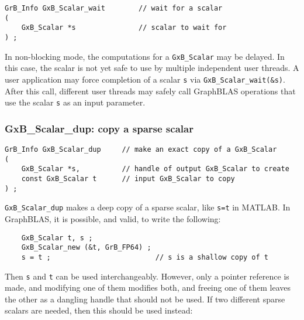\documentclass[12pt]{article}
\begin{document}
\begin{mdframed}[userdefinedwidth=6in]
{\footnotesize
\begin{verbatim}
GrB_Info GxB_Scalar_wait        // wait for a scalar
(
    GxB_Scalar *s               // scalar to wait for
) ;
\end{verbatim}
}\end{mdframed}

In non-blocking mode, the computations for a \verb'GxB_Scalar' may be delayed.
In this case, the scalar is not yet safe to use by multiple independent user
threads.  A user application may force completion of a scalar \verb's' via
\verb'GxB_Scalar_wait(&s)'.  After this call, different user threads may safely
call GraphBLAS operations that use the scalar \verb's' as an input parameter.

\newpage
\subsubsection{{\sf GxB\_Scalar\_dup:} copy a sparse scalar}
\label{scalar_dup}

\begin{mdframed}[userdefinedwidth=6in]
{\footnotesize
\begin{verbatim}
GrB_Info GxB_Scalar_dup     // make an exact copy of a GxB_Scalar
(
    GxB_Scalar *s,          // handle of output GxB_Scalar to create
    const GxB_Scalar t      // input GxB_Scalar to copy
) ;
\end{verbatim}
} \end{mdframed}

\verb'GxB_Scalar_dup' makes a deep copy of a sparse scalar, like \verb's=t' in
MATLAB.  In GraphBLAS, it is possible, and valid, to write the following:

    {\footnotesize
    \begin{verbatim}
    GxB_Scalar t, s ;
    GxB_Scalar_new (&t, GrB_FP64) ;
    s = t ;                         // s is a shallow copy of t  \end{verbatim}}

Then \verb's' and \verb't' can be used interchangeably.  However, only a pointer
reference is made, and modifying one of them modifies both, and freeing one of
them leaves the other as a dangling handle that should not be used.
If two different sparse scalars are needed, then this should be used instead:
\end{document}
